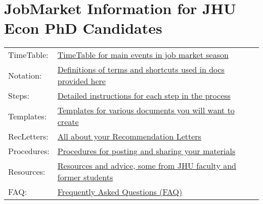 \documentclass{\classes/econtex}
\begin{document}
\medskip


\section*{JobMarket Information for JHU Econ PhD Candidates}

\begin{tabular}{ll}
  TimeTable: & \href{\pageurl/TimeTable}{TimeTable for main events in job market season} \\
  Notation: & \href{\pageurl/Notation}{Definitions of terms and shortcuts used in docs provided here} \\
  Steps: & \href{\pageurl/Steps}{Detailed instructions for each step in the process} \\
  Templates: & \href{\bloburl/Templates}{Templates for various documents you will want to create} \\
  RecLetters: & \href{\pageurl/RecLetters}{All about your Recommendation Letters} \\
  Procedures: & \href{\bloburl/JobMarketProceduresHelp.md}{Procedures for posting and sharing your materials} \\
  Resources: & \href{\bloburl/Resources}{Resources and advice, some from JHU faculty and former students} \\
  FAQ: & \href{\pageurl/FAQ}{Frequently Asked Questions (FAQ)} \\
\end{tabular}
\end{document}
